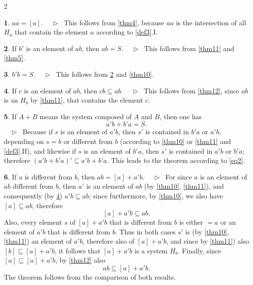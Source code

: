 \documentclass[leqno,hidelinks,10pt]{article}
\theoremstyle{definition}
\newtheorem{satz}{\protect\satzname}
\newcommand{\satzname}{}
\renewcommand{\satzname}{\hspace{-4pt}.\ Satz}%
\renewcommand{\satzname}{\hspace{-4pt}.\ Theorem}%
\newcommand\Beweis{\medskip \newline $ \phantom{'.'} \rhd \ $}%
\newcommand\beweis{ $ \phantom{'.'} \rhd \ $}%
\newcommand{\partof}{\subseteq}
\newcommand{\sref}[1]{\underline{\ref{#1}}}%
\begin{document}
\begin{paracol}{2}
\begin{rightcolumn}
\begin{satz}\label{thm13}
$aa = [a]$.
\Beweis
This follows from \sref{thm4}, because $aa$ is the intersection of all $H_a$
that contain the element $a$ according to \sref{def3}.I.
\end{satz}

\begin{satz}\label{thm14}
If $b'$ is an element of $ab$, then $ab = S$.
\Beweis
This follows from \sref{thm11} and \sref{thm5}.
\end{satz}

\begin{satz}\label{thm15}
$b' b = S$.
\Beweis
This follows from \sref{thm14} and \sref{thm10}.
\end{satz}

\begin{satz}\label{thm16}
If $c$ is an element of $ab$, then $cb \partof ab$.
\Beweis
This follows from \sref{thm12}, since $ab$ is an $H_b$ by \sref{thm11}, that
contains the element $c$.
\end{satz}

\begin{satz}\label{thm17}
If $A + B$ means the system composed of $A$ and $B$, then one has
\[
	a'b + b'a = S.
\]%
\beweis
Because if $s$ is an element of $a'b$, then $s'$ is contained in $b'a$ or $a'b$,
depending on $s = b$ or different from $b$ (according to \sref{thm10} or
\sref{thm11} and \sref{def3}.II), and likewise if $s$ is an element of $b'a$,
then $s'$ is contained in $a'b$ or $b'a$; therefore $(a'b + b'a)' \partof a'b + b'a$.
This leads to the theorem according to \eqref{eq2}.
\end{satz}

\begin{satz}\label{thm18}
If $a$ is different from $b$, then $ab = [a] + a'b$.
\Beweis
For since $a$ is an element of $ab$ different from $b$, then $a'$ is an element
of $ab$ (by \sref{thm10}, \sref{thm11}), and consequently (by \sref{thm16})
$a'b \partof ab$; since furthermore, by \sref{thm10}, we also have $[a]
\partof ab$, therefore
\[
	[a] + a'b \partof ab.
\]
Also, every element $s$ of $[a] + a'b$ that is different from $b$ is either
$= a$ or an element of $a'b$ that is different from $b$. Thus in both cases $s'$
is (by \sref{thm10}, \sref{thm11}) an element of $a'b$, therefore also of
$[a]+ a'b$, and since by \sref{thm11}) also $[b] \partof [a] + a'b$, it follows
that $[a] + a'b$ is a system $H_b$. Finally, since $[a] \partof [a] + a'b$, by
\sref{thm12} also
\[
	ab \partof [a] + a' b.
\]
The theorem follows from the comparison of both results.
\end{satz}


\end{rightcolumn}
\end{paracol}
\end{document}
